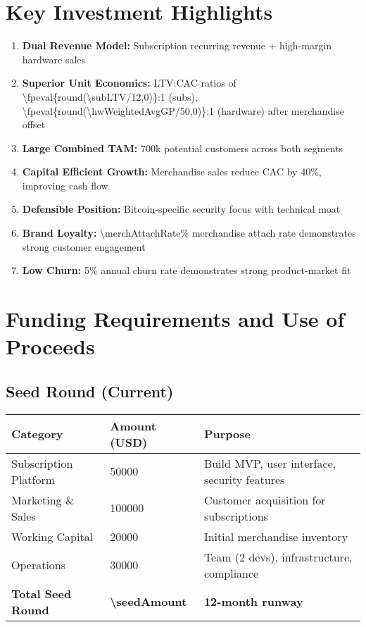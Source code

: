 \documentclass[11pt]{article}
\newcommand{\numfpeval}[1]{\num{\fpeval{#1}}}
\begin{document}
\section{Key Investment Highlights}

\begin{enumerate}
  \item \textbf{Dual Revenue Model:} Subscription recurring revenue + high-margin hardware sales
  \item \textbf{Superior Unit Economics:} LTV:CAC ratios of \numfpeval{round(\subLTV/12,0)}:\num{1} (subs), \numfpeval{round(\hwWeightedAvgGP/50,0)}:\num{1} (hardware) after merchandise offset
  \item \textbf{Large Combined TAM:} \num{700}k potential customers across both segments
  \item \textbf{Capital Efficient Growth:} Merchandise sales reduce CAC by \num{40}\%, improving cash flow
  \item \textbf{Defensible Position:} Bitcoin-specific security focus with technical moat
  \item \textbf{Brand Loyalty:} \num{\merchAttachRate}\% merchandise attach rate demonstrates strong customer engagement
  \item \textbf{Low Churn:} \num{5}\% annual churn rate demonstrates strong product-market fit
\end{enumerate}

\section{Funding Requirements and Use of Proceeds}

\subsection{Seed Round (Current)}
\begin{table}[H]
\centering
\begin{tabularx}{\linewidth}{l Y Y}
\toprule
Category & Amount (USD) & Purpose \\\midrule
Subscription Platform & \num{50000} & Build MVP, user interface, security features \\
Marketing \& Sales & \num{100000} & Customer acquisition for subscriptions \\
Working Capital & \num{20000} & Initial merchandise inventory \\
Operations & \num{30000} & Team (2 devs), infrastructure, compliance \\
\textbf{Total Seed Round} & \textbf{\num{\seedAmount}} & \textbf{12-month runway} \\
\bottomrule
\end{tabularx}
\end{table}
\end{document}
